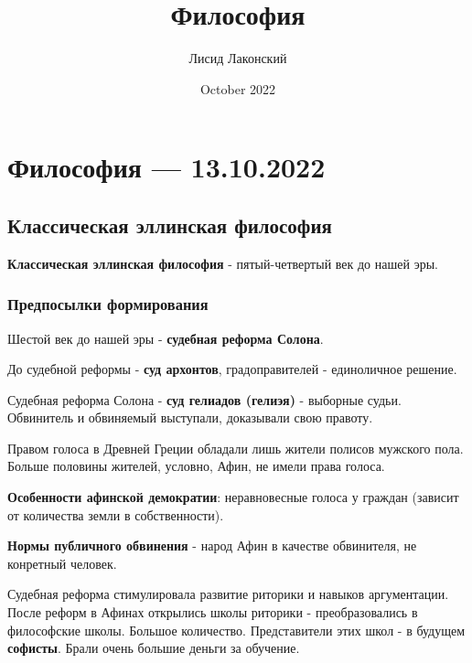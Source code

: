 \documentclass{article}
\title{Философия}
\author{Лисид Лаконский}
\date{October 2022}
\begin{document}
\maketitle
\tableofcontents
\pagebreak

\section{Философия — 13.10.2022}

\subsection{Классическая эллинская философия}

\begin{flushleft}

\textbf{Классическая эллинская философия} - пятый-четвертый век до нашей эры. 

\subsubsection{Предпосылки формирования}

Шестой век до нашей эры - \textbf{судебная реформа Солона}.

До судебной реформы - \textbf{суд архонтов}, градоправителей - единоличное решение.

Судебная реформа Солона - \textbf{суд гелиадов (гелиэя)} - выборные судьи. Обвинитель и обвиняемый выступали, доказывали свою правоту.

\hfill

Правом голоса в Древней Греции обладали лишь жители полисов мужского пола. Больше половины жителей, условно, Афин, не имели права голоса.

\hfill

\textbf{Особенности афинской демократии}: неравновесные голоса у граждан (зависит от количества земли в собственности).

\hfill

\textbf{Нормы публичного обвинения} - народ Афин в качестве обвинителя, не конретный человек.

\hfill

Судебная реформа стимулировала развитие риторики и навыков аргументации. После реформ в Афинах открылись школы риторики - преобразовались в философские школы. Большое количество. Представители этих школ - в будущем \textbf{софисты}. Брали очень большие деньги за обучение.

\hfill


\end{flushleft}
\end{document}
